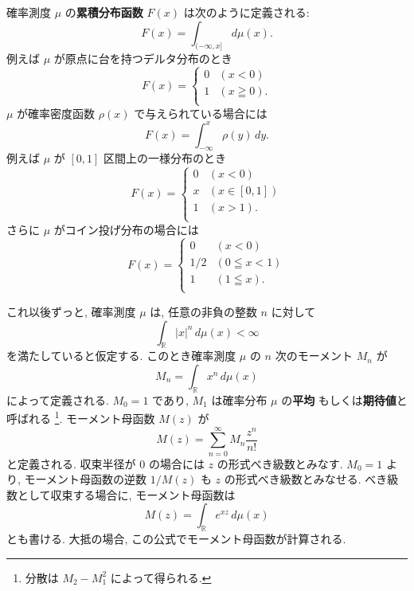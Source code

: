 \documentclass[12pt,twoside]{jarticle}
\newcommand\BF{\bfseries}
\newcommand\R{{\mathbb R}} %
\theoremstyle{jplain}
\theoremstyle{jplain}
\theoremstyle{jplain}
\numberwithin{theorem}{section}
\numberwithin{equation}{section}
\numberwithin{figure}{section}
\numberwithin{table}{section}
\begin{document}
確率測度 $\mu$ の{\BF 累積分布函数} $F(x)$ は次のように定義される:
\begin{equation*}
  F(x)= \int_{(-\infty,x]} d\mu(x).
\end{equation*}
例えば $\mu$ が原点に台を持つデルタ分布のとき
\begin{equation*}
  F(x)=\begin{cases}
    0 & (x<0) \\
    1 & (x\geqq 0). \\
  \end{cases}
\end{equation*}
$\mu$ が確率密度函数 $\rho(x)$ で与えられている場合には
\begin{equation*}
  F(x) = \int_{-\infty}^x \rho(y)\,dy.
\end{equation*}
例えば $\mu$ が $[0,1]$ 区間上の一様分布のとき
\begin{equation*}
  F(x) = \begin{cases}
    0 & (x<0) \\
    x & (x\in[0,1]) \\
    1 & (x>1). \\
\end{cases}
\end{equation*}
さらに $\mu$ がコイン投げ分布の場合には
\begin{equation*}
  F(x) = \begin{cases}
    0 & (x<0) \\
    1/2 & (0\leqq x < 1) \\
    1 & (1\leqq x). \\
  \end{cases}
\end{equation*}

これ以後ずっと, 確率測度 $\mu$ は, 任意の非負の整数 $n$ に対して
\begin{equation*}
  \int_\R |x|^n\,d\mu(x) < \infty
\end{equation*}
を満たしていると仮定する.
このとき確率測度 $\mu$ の $n$ 次のモーメント $M_n$ が
\begin{equation*}
  M_n = \int_\R x^n\,d\mu(x)
\end{equation*}
によって定義される. $M_0=1$ であり,
$M_1$ は確率分布 $\mu$ の{\BF 平均}
もしくは{\BF 期待値}と呼ばれる%
\footnote{分散は $M_2-M_1^2$ によって得られる.}.
モーメント母函数 $M(z)$ が
\begin{equation*}
  M(z) = \sum_{n=0}^\infty M_n \frac{z^n}{n!}
\end{equation*}
と定義される.
収束半径が $0$ の場合には $z$ の形式べき級数とみなす.
$M_0=1$ より, モーメント母函数の逆数 $1/M(z)$ も $z$ の形式べき級数とみなせる.
べき級数として収束する場合に, モーメント母函数は
\begin{equation*}
  M(z) = \int_\R e^{xz}\,d\mu(x)
\end{equation*}
とも書ける.
大抵の場合, この公式でモーメント母函数が計算される.
\end{document}

